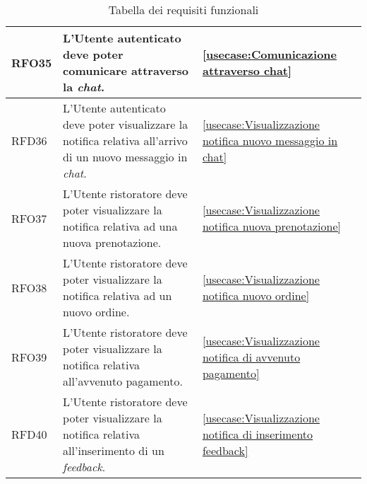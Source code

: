 \begin{table}[H]
\begin{tabularx}{\textwidth}{l|X|p{2cm}}
		\hline
		RFO35       & L'Utente autenticato deve poter comunicare attraverso la \textit{chat}.                                              & \autoref{usecase:Comunicazione attraverso chat}                                               \\
		\hline
		RFD36       & L'Utente autenticato deve poter visualizzare la notifica relativa all'arrivo di un nuovo messaggio in \textit{chat}. & \autoref{usecase:Visualizzazione notifica nuovo messaggio in chat}                            \\
		\hline
		RFO37       & L'Utente ristoratore deve poter visualizzare la notifica relativa ad una nuova prenotazione.                         & \autoref{usecase:Visualizzazione notifica nuova prenotazione}                                 \\
		\hline
		RFO38       & L'Utente ristoratore deve poter visualizzare la notifica relativa ad un nuovo ordine.                                & \autoref{usecase:Visualizzazione notifica nuovo ordine}                                       \\
		\hline
		RFO39       & L'Utente ristoratore deve poter visualizzare la notifica relativa all'avvenuto pagamento.                            & \autoref{usecase:Visualizzazione notifica di avvenuto pagamento}                              \\
		\hline
		RFD40       & L'Utente ristoratore deve poter visualizzare la notifica relativa all'inserimento di un \textit{feedback}.           & \autoref{usecase:Visualizzazione notifica di inserimento feedback}                            \\
	\end{tabularx}
	\caption{Tabella dei requisiti funzionali}
\end{table}


